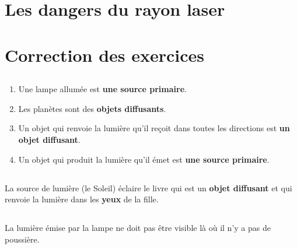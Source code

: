\documentclass[12pt,a4paper]{article}
\begin{document}
\section{Les dangers du rayon laser}








\begin{myexos}
\end{myexos}
\appendix

\newpage

\section*{Correction des exercices}

\subsection*{}

\begin{enumerate}[label=\alph*)]
	\item Une lampe allumée est \textbf{une source primaire}.
	\item Les planètes sont des \textbf{objets diffusants}.
	\item Un objet qui renvoie la lumière qu'il reçoit dans toutes les directions est \textbf{un objet diffusant}.
	\item Un objet qui produit la lumière qu'il émet est \textbf{une source primaire}.
\end{enumerate}

\subsection*{}
	La {source de lumière} (le Soleil) éclaire le livre qui est un \textbf{objet diffusant} et qui renvoie la lumière dans les \textbf{yeux} de la fille.

\subsection*{}
	La lumière émise par la lampe ne doit pas être visible là où il n'y a pas de poussière.
	
\end{document}
